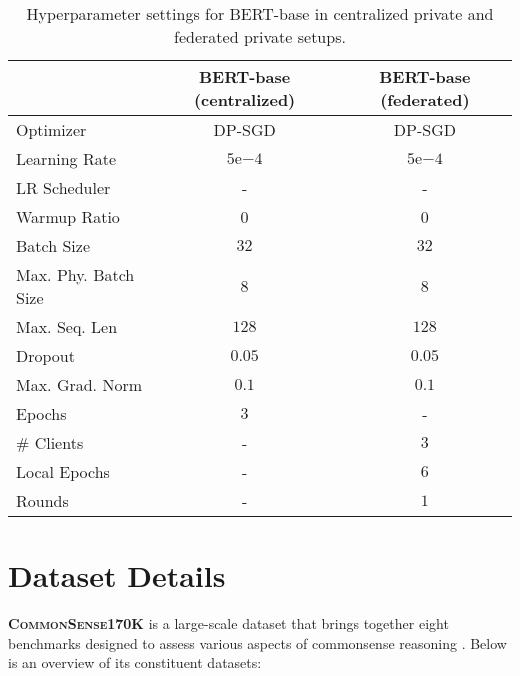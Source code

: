 \begin{table*}[!h]
\centering
\begin{tabular}{lcc}
\toprule
 & \textbf{BERT-base (centralized)} & \textbf{BERT-base (federated)} \\
\midrule
Optimizer        & DP-SGD      & DP-SGD      \\
Learning Rate    & $5\mathrm{e}{-4}$ & $5\mathrm{e}{-4}$ \\
LR Scheduler     & -    & -   \\
Warmup Ratio     & 0     & 0 \\
Batch Size       & $32$        & $32$\\
Max. Phy. Batch Size       & $8$        & $8$\\
Max. Seq. Len    & $128$      & $128$\\
Dropout          & $0.05$        & $0.05$\\
Max. Grad. Norm & $0.1$ & $0.1$ \\
Epochs & $3$ & - \\
\midrule
\# Clients   & -      & $3$\\
Local Epochs     & -        & $6$\\
Rounds           & -        & $1$\\
\bottomrule
\end{tabular}
\caption{Hyperparameter settings for BERT-base in centralized private and federated private setups.}
\label{tab:hyper_bert}
\end{table*}



\section{Dataset Details} \label{app:datasets}


\textsc{\textbf{CommonSense170K}} is a large-scale dataset that brings together eight benchmarks designed to assess various aspects of commonsense reasoning \citep{cr-dataset}. Below is an overview of its constituent datasets:

